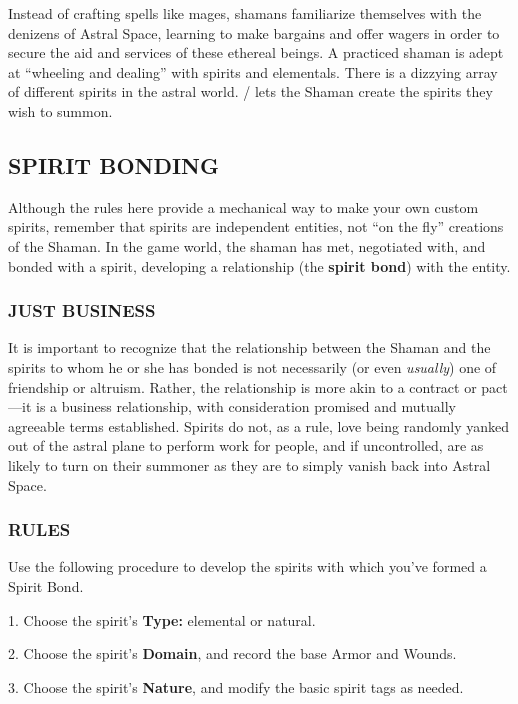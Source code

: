 \documentclass[oneside,10pt]{article}
\begin{document}
\begin{multicols}{2}
Instead of crafting spells like mages, shamans familiarize
themselves with the denizens of Astral Space, learning to
make bargains and offer wagers in order to secure the aid
and services of these ethereal beings. A practiced shaman is
adept at ``wheeling and dealing'' with spirits and elementals.
There is a dizzying array of different spirits in the astral world.
\SW/ lets the Shaman create the spirits they wish to
summon.

\subsection{SPIRIT BONDING}
Although the rules here provide a mechanical way to make
your own custom spirits, remember that spirits are independent entities, not ``on the fly'' creations of the Shaman. In
the game world, the shaman has met, negotiated with, and
bonded with a spirit, developing a relationship (the \textbf{spirit
bond}) with the entity.

\subsubsection{JUST BUSINESS}
It is important to recognize that the relationship between the
Shaman and the spirits to whom he or she has bonded is
not necessarily (or even \textit{usually}) one of friendship or altruism.
Rather, the relationship is more akin to a contract or pact—it
is a business relationship, with consideration promised and
mutually agreeable terms established. Spirits do not, as a
rule, love being randomly yanked out of the astral plane to
perform work for people, and if uncontrolled, are as likely to
turn on their summoner as they are to simply vanish back into
Astral Space.

\subsubsection{RULES}
Use the following procedure to develop the spirits with which
you’ve formed a Spirit Bond.
\begin{dent}

1.	Choose the spirit’s \textbf{Type:} elemental or natural.

2.	Choose the spirit’s \textbf{Domain}, and record the base Armor
and Wounds.

3.	Choose the spirit’s \textbf{Nature}, and modify the basic spirit
tags as needed.


\end{dent}
\end{multicols}
\end{document}
